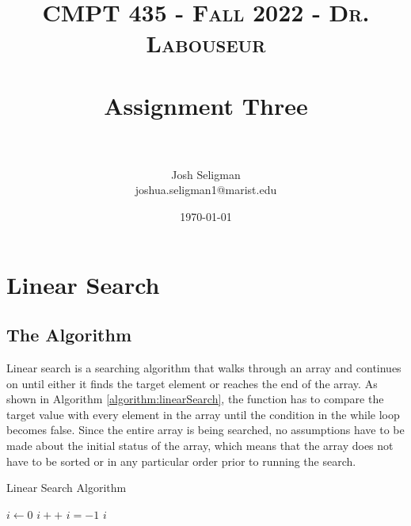\documentclass[letterpaper, 10pt,DIV=13]{scrartcl}
\title{	
   \normalfont \normalsize 
   \textsc{CMPT 435 - Fall 2022 - Dr. Labouseur} \\[10pt] %
   \horrule{0.5pt} \\[0.25cm] 	%
   \huge Assignment Three  \\     	    %
   \horrule{0.5pt} \\[0.25cm] 	%
}
\author{Josh Seligman \\ \normalsize joshua.seligman1@marist.edu}
\date{\normalsize\today} 	%
\numberwithin{equation}{section} %
\numberwithin{figure}{section} %
\numberwithin{table}{section} %
\begin{document}
\maketitle %

\section{Linear Search}
\subsection{The Algorithm}\label{linearSearch}
Linear search is a searching algorithm that walks through an array and continues on until either it finds the target element or reaches the end of the array. As shown in Algorithm \ref{algorithm:linearSearch}, the function has to compare the target value with every element in the array until the condition in the while loop becomes false. Since the entire array is being searched, no assumptions have to be made about the initial status of the array, which means that the array does not have to be sorted or in any particular order prior to running the search.

\begin{algorithm}
  \caption{Linear Search Algorithm}
  \label{algorithm:linearSearch}
  \begin{algorithmic}[1]
        \State $i \gets 0$ 
         
          \State $i++$
        \EndWhile
          \State $i = -1$ 
        \EndIf
        \State \Return $i$
      \EndProcedure
  \end{algorithmic}
\end{algorithm}
\end{document}
